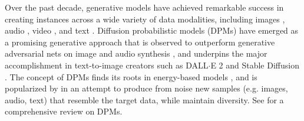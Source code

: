\documentclass[letterpaper,11pt,reqno]{amsart}
\numberwithin{equation}{section}
\begin{document}
\quad Over the past decade, generative models have achieved remarkable success
in creating instances across a wide variety of data modalities,
including images \cite{Good14, Brock18, Razavi19},
audio \cite{Prenger19, Borsos23}, video \cite{Kal17},
and text \cite{Vaswani17, Brown20, Yang19}.
Diffusion probabilistic models (DPMs) have emerged as a promising generative approach
that is observed to outperform generative adversarial nets on image and audio synthesis \cite{Dh21, Kong21},
and underpins the major accomplishment in text-to-image creators such as 
DALL$\cdot$E 2 \cite{Ramesh22} and Stable Diffusion \cite{Rombach22}.
The concept of DPMs finds its roots in energy-based models \cite{Sohl15},
and is popularized by  \cite{Song19, Song20, Ho20}
in an attempt to produce from noise new samples 
(e.g. images, audio, text)
that resemble the target data, while maintain diversity.
See \cite{Yang23} for a comprehensive review on DPMs.
\end{document}
